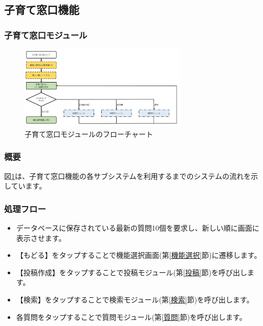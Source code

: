 \documentclass[a4j]{jarticle}
\begin{document}
\subsection{子育て窓口機能}
\subsubsection{子育て窓口モジュール\label{子育て窓口モジュール}} %

\begin{figure}[H]
    \begin{center}
      \includegraphics[height = 4.0cm]{子育て窓口_全体.png} %
    \caption {子育て窓口モジュールのフローチャート}
    \label{子育て窓口_全体}
    \end{center}
\end{figure}

\subsubsection*{概要}
図\ref{子育て窓口_全体}は、子育て窓口機能の各サブシステムを利用するまでのシステムの流れを示しています。
\subsubsection*{処理フロー}
\begin{itemize}
\item データベースに保存されている最新の質問10個を要求し、新しい順に画面に表示させます。
\item 【もどる】をタップすることで機能選択画面(第\ref{機能選択}節)に遷移します。
\item 【投稿作成】をタップすることで投稿モジュール(第\ref{投稿}節)を呼び出します。
\item 【検索】をタップすることで検索モジュール(第\ref{検索}節)を呼び出します。
\item 各質問をタップすることで質問モジュール(第\ref{質問}節)を呼び出します。

\end{itemize}
\end{document}
